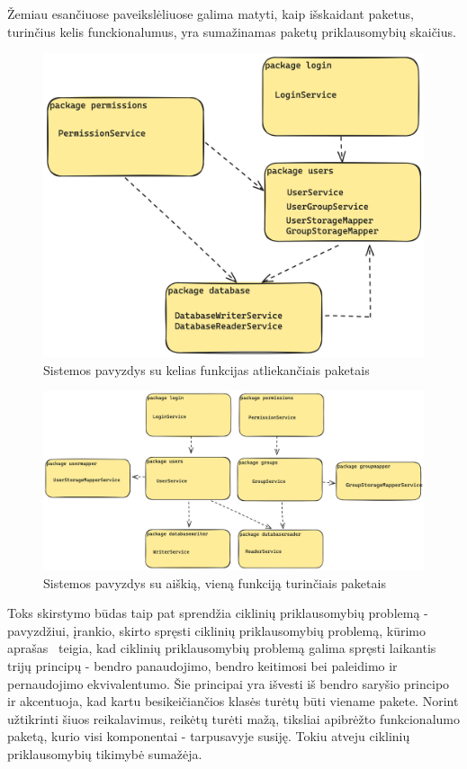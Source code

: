 Žemiau esančiuose paveikslėliuose galima matyti, kaip išskaidant paketus, turinčius kelis funckionalumus, yra sumažinamas paketų
priklausomybių skaičius.
\begin{figure}[H]
    \centering
    \includegraphics[scale=0.15]{img/excesive_deps}
    \caption{Sistemos pavyzdys su kelias funkcijas atliekančiais paketais}
    \label{img:excesive_deps}
\end{figure}


\begin{figure}[H]
    \centering
    \includegraphics[scale=0.13]{img/good_deps}
    \caption{Sistemos pavyzdys su aiškią, vieną funkciją turinčiais paketais}
    \label{img:good_deps}
\end{figure}

Toks skirstymo būdas taip pat sprendžia ciklinių priklausomybių problemą - pavyzdžiui, įrankio, skirto spręsti ciklinių priklausomybių problemą,
kūrimo aprašas~\cite{CircularDependencies} teigia, kad ciklinių priklausomybių problemą galima spręsti laikantis trijų principų -
bendro panaudojimo, bendro keitimosi bei paleidimo ir pernaudojimo ekvivalentumo.
Šie principai yra išvesti iš bendro saryšio principo ir akcentuoja, kad kartu besikeičiančios klasės turėtų būti viename pakete.
Norint užtikrinti šiuos reikalavimus, reikėtų turėti mažą,
tiksliai apibrėžto funkcionalumo paketą, kurio visi komponentai - tarpusavyje susiję.
Tokiu atveju ciklinių priklausomybių tikimybė sumažėja.


